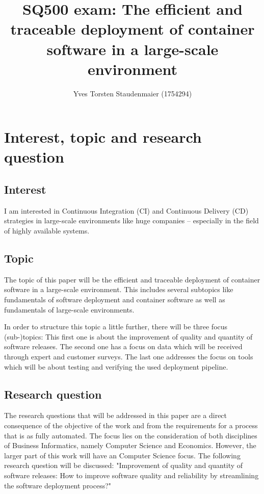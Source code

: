 \documentclass{article}
\begin{document}
\title{SQ500 exam: The efficient and traceable deployment of container software in a large-scale environment}
\author{Yves Torsten Staudenmaier (1754294)}
\maketitle

\tableofcontents
\newpage
\listoftables
\newpage

\section{Interest, topic and research question}
\subsection{Interest}
I am interested in Continuous Integration (CI) and Continuous Delivery (CD) strategies in large-scale environments like huge companies -- especially in the field of highly available systems.
\subsection{Topic}
The topic of this paper will be the efficient and traceable deployment of container software in a large-scale environment. This includes several subtopics like fundamentals of software deployment and container software as well as fundamentals of large-scale environments. \par
In order to structure this topic a little further, there will be three focus (sub-)topics: This first one is about the improvement of quality and quantity of software releases. The second one has a focus on data which will be received through expert and customer surveys. The last one addresses the focus on tools which will be about testing and verifying the used deployment pipeline. 
\subsection{Research question}
The research questions that will be addressed in this paper are a direct consequence of the objective of the work and from the requirements for a process that is as fully automated. The focus lies on the consideration of both disciplines of Business Informatics, namely Computer Science and Economics. However, the larger part of this work will have an Computer Science focus. The following research question will be discussed: "Improvement of quality and quantity of software releases: How to improve software quality and reliability by streamlining the software deployment process?"
\end{document}
